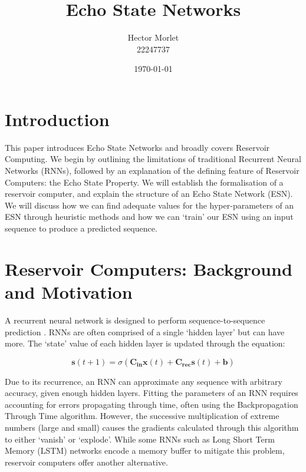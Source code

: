 \documentclass[a4paper,12pt]{article}
\title{Echo State Networks}
\author{Hector Morlet \\ 22247737}
\date{\today}
\begin{document}

\maketitle

\section*{Introduction}

This paper introduces Echo State Networks and broadly covers Reservoir Computing. We begin by outlining the limitations of traditional Recurrent Neural Networks (RNNs), followed by an explanation of the defining feature of Reservoir Computers: the Echo State Property. We will establish the formalisation of a reservoir computer, and explain the structure of an Echo State Network (ESN). We will discuss how we can find adequate values for the hyper-parameters of an ESN through heuristic methods and how we can `train' our ESN using an input sequence to produce a predicted sequence.

\section*{Reservoir Computers: Background and Motivation}

A recurrent neural network is designed to perform sequence-to-sequence prediction \cite{lukosevicius2009reservoir}. RNNs are often comprised of a single `hidden layer' but can have more. The `state' value of each hidden layer is updated through the equation:

\begin{equation*}
\mathbf{s}(t+1) = \sigma (\mathbf{C_{in}} \mathbf{x}(t) + \mathbf{C_{rec}} \mathbf{s}(t) + \mathbf{\mathbf{b}})
\end{equation*}

Due to its recurrence, an RNN can approximate any sequence with arbitrary accuracy, given enough hidden layers. Fitting the parameters of an RNN requires accounting for errors propagating through time, often using the Backpropagation Through Time algorithm. However, the successive multiplication of extreme numbers (large and small) causes the gradients calculated through this algorithm to either `vanish' or `explode'\cite{lukosevicius2009reservoir}. While some RNNs such as Long Short Term Memory (LSTM) networks encode a memory buffer to mitigate this problem, reservoir computers offer another alternative.
\end{document}
